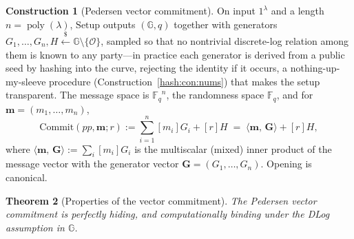 \documentclass[11pt,a4paper]{article}
\newtheorem{theorem}{Theorem}[section]
\theoremstyle{definition}
\newtheorem{construction}[theorem]{Construction}
\theoremstyle{remark}
\newcommand{\G}{\ensuremath{\mathbb{G}}}
\newcommand{\Fq}{\ensuremath{\mathbb{F}_{q}}}
\newcommand{\ip}[2]{\langle #1,\, #2 \rangle}
\DeclareMathOperator{\poly}{poly}
\begin{document}
\begin{construction}[Pedersen vector commitment]
\label{commitments:def:pedersen-vector}
On input \(1^\lambda\) and a length \(n = \poly(\lambda)\),
\(\mathrm{Setup}\) outputs \((\G, q)\) together with generators
\(G_1, \dots, G_n, H \xleftarrow{\$} \G \setminus \{\mathcal O\}\),
sampled so that no nontrivial discrete-log relation among them is
known to any party---in practice each generator is derived from a
public seed by hashing into the curve, rejecting the identity if it
occurs, a nothing-up-my-sleeve procedure
(Construction~\ref{hash:con:nums}) that makes the setup transparent.
The
message space is \(\Fq^{n}\), the randomness space \(\Fq\), and for
\(\mathbf m = (m_1, \dots, m_n)\),
\[
\mathrm{Commit}(pp, \mathbf m; r)
:= \sum_{i=1}^{n} [m_i]G_i + [r]H
\;=\; \ip{\mathbf m}{\mathbf G} + [r]H,
\]
where \(\ip{\mathbf m}{\mathbf G} := \sum_i [m_i]G_i\) is the
multiscalar (mixed) inner product of the message vector with the
generator vector \(\mathbf G = (G_1, \dots, G_n)\). Opening is
canonical.
\end{construction}

\begin{theorem}[Properties of the vector commitment]
\label{commitments:thm:vector-props}
The Pedersen vector commitment is perfectly hiding, and
computationally binding under the DLog assumption in \(\G\).
\end{theorem}
\end{document}
